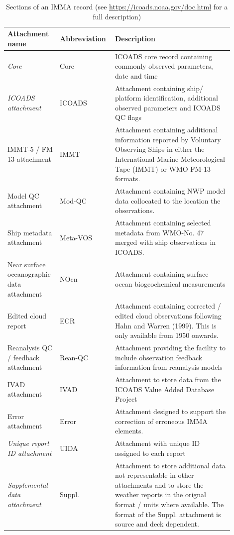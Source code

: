 \begin{table}
\centering
\caption{Sections of an IMMA record (see \url{https://icoads.noaa.gov/doc.html} for a full description)}
\label{tab:imma_structure}
\begin{tabular}{|p{0.2\linewidth}|p{0.2\linewidth}|p{0.5\linewidth}|}
\hline
\bfseries Attachment name & \bfseries Abbreviation & \bfseries Description \\
\hline
\it Core & Core & ICOADS core record containing commonly observed parameters, date and time\\\hline
\it ICOADS attachment & ICOADS & Attachment containing ship/ platform identification, additional observed parameters and ICOADS QC flags \\\hline
IMMT-5 / FM 13 attachment & IMMT & Attachment containing additional information reported by Voluntary Observing Ships in either the International Marine Meteorological Tape (IMMT) or WMO FM-13 formats. \\\hline
Model QC attachment & Mod-QC & Attachment containing NWP model data collocated to the location the observations. \\\hline
Ship metadata attachment & Meta-VOS & Attachment containing selected metadata from WMO-No. 47 merged with ship observations in ICOADS. \\\hline
Near surface oceanographic data attachment & NOcn & Attachment containing surface ocean biogeochemical measurements \\\hline
Edited cloud report & ECR & Attachment containing corrected / edited cloud observations following Hahn and Warren (1999). This is only available from 1950 onwards. \\\hline
Reanalysis QC / feedback attachment & Rean-QC & Attachment providing the facility to include observation feedback information from reanalysis models \\\hline
IVAD attachment & IVAD & Attachment to store data from the ICOADS Value Added Database Project \\\hline
Error attachment & Error & Attachment designed to support the correction of erroneous IMMA elements. \\\hline
\it Unique report ID attachment & UIDA & Attachment with unique ID assigned to each report \\\hline
\it Supplemental data attachment & Suppl. & Attachment to store additional data not representable in other attachments and to store the weather reports in the orignal format / units where available. The format of the Suppl. attachment is source and deck dependent.\\\hline
\end{tabular}
\end{table}

